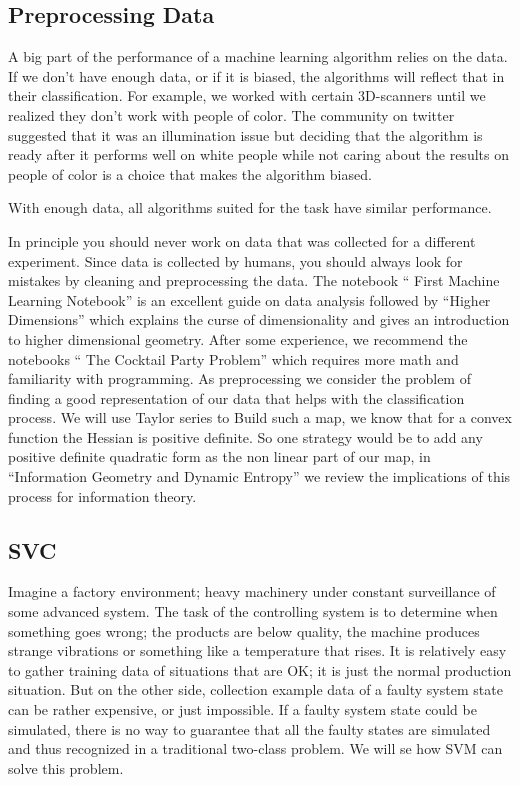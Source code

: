 \documentclass[11pt,letterpaper]{report}
\begin{document}
	\subsection{Preprocessing Data}

	
	 A big part of the performance of a machine learning algorithm relies on the data. If we don't have enough data, or if it is biased, the algorithms will reflect that in their classification. For example, we worked with certain 3D-scanners until we realized they don't work with people of color. The community on twitter suggested that it was an illumination issue but deciding that the algorithm is ready after it performs well on white people while not caring about the results on people of color is a choice that makes the algorithm biased.
	 
	 With enough data, all algorithms suited for the task have similar performance. 
	 
	  In principle you should never work on data that was collected for a different experiment. Since data is collected by humans, you should always look for mistakes by cleaning and preprocessing the data. The  notebook `` First Machine Learning Notebook'' is an excellent guide on data analysis followed by ``Higher Dimensions'' which explains the curse of dimensionality and gives an introduction to higher dimensional geometry. After some experience, we recommend  the notebooks `` The Cocktail Party Problem'' which requires more math and familiarity with programming. As preprocessing we consider the problem of finding a good representation of our data that helps with the classification process. We will use Taylor series to Build such a map, we know that for a convex function the Hessian is positive definite. So one strategy would be to add any positive definite quadratic form as the non linear part of our map, in ``Information Geometry and Dynamic Entropy'' we review the implications of this process for information theory.
 	
 	
	\subsection{SVC}
	Imagine a factory environment; heavy machinery under constant surveillance of some advanced system. The task of the controlling system is to determine when something goes wrong; the products are below quality, the machine produces strange vibrations or something like a temperature that rises. It is relatively easy to gather training data of situations that are OK; it is just the normal production situation. But on the other side, collection example data of a faulty system state can be rather expensive, or just impossible. If a faulty system state could be simulated, there is no way to guarantee that all the faulty states are simulated and thus recognized in a traditional two-class problem. We will se how SVM can solve this problem.
	
\end{document}
